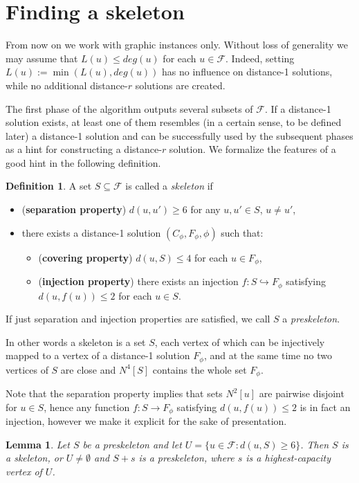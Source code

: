 \documentclass{article}
\newcommand{\F}{\mathcal{F}}
\newcommand{\sub}{\subseteq}
\theoremstyle{plain}
\newtheorem{lemma}[theorem]{Lemma}
\theoremstyle{definition}
\newtheorem{definition}[theorem]{Definition}
\begin{document}
\section{Finding a skeleton}
\label{sec:skeleton}
From now on we work with graphic instances only.
Without loss of generality we may assume that $L(u)\le deg(u)$ for each $u\in
\F$.  Indeed, setting
 $L(u) := \min(L(u),deg(u))$ has no influence on distance-1 solutions, while no
 additional distance-$r$ solutions are created.

The first phase of the algorithm outputs several subsets of $\F$.
If a distance-1 solution exists, at least one of them resembles (in a certain
sense, to be defined later) a distance-1 solution and can be successfully used
by the subsequent phases as a hint for constructing a distance-$r$ solution. 
We formalize the features of a good hint in the following definition.
\begin{definition}
A set $S \sub \F$ is called a \emph{skeleton} if
\begin{itemize}
  \item ({\bf separation property}) $d(u,u')\ge 6$ for any $u,u'\in S$, $u \neq u'$,
  \item there exists a distance-1 solution $(C_\phi, F_\phi, \phi)$ such that:
  \begin{itemize}
    \item ({\bf covering property}) $d(u, S)\le 4$ for each $u\in F_\phi$,
    \item ({\bf injection property}) there exists an injection $f: S \hookrightarrow F_\phi$ 
    satisfying $d(u, f(u))\le2$ for each $u \in S$.
  \end{itemize}
\end{itemize}
If just separation and injection properties are satisfied, we call $S$ a \emph{preskeleton}.
\end{definition}

In other words a skeleton is a set $S$, each vertex of which
can be injectively mapped to a vertex of a distance-1 solution $F_\phi$,
and at the same time no two vertices of $S$ are close
and $N^4[S]$ contains the whole set $F_\phi$.

Note that the separation property implies that sets $N^2[u]$ are pairwise disjoint for
$u\in S$, hence any function $f:S \to F_\phi$ satisfying $d(u, f(u))\le2$ 
is in fact an injection, however we make it explicit for the sake of presentation.

\begin{lemma}\label{lem:ind}
Let $S$ be a preskeleton and let $U=\{u\in \F : d(u,S)\ge 6\}$.
Then $S$ is a skeleton, or $U\ne \emptyset$ and $S+s$ is a preskeleton,
where $s$ is a highest-capacity vertex of $U$.
\end{lemma}
\end{document}
